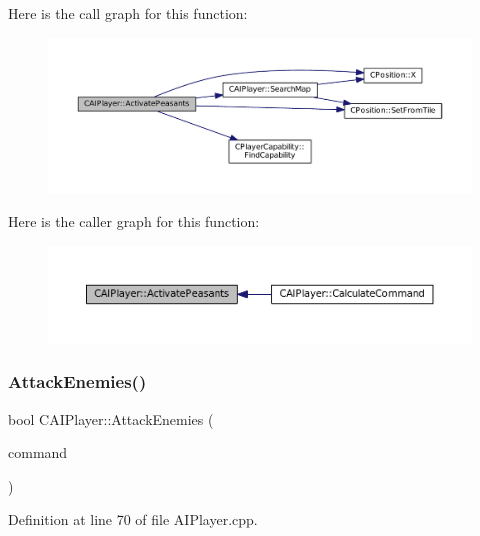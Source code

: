 Here is the call graph for this function\+:\nopagebreak
\begin{figure}[H]
\begin{center}
\leavevmode
\includegraphics[width=350pt]{classCAIPlayer_a3fab1c955fd68bb53fa80bb1872d2819_cgraph}
\end{center}
\end{figure}
Here is the caller graph for this function\+:\nopagebreak
\begin{figure}[H]
\begin{center}
\leavevmode
\includegraphics[width=350pt]{classCAIPlayer_a3fab1c955fd68bb53fa80bb1872d2819_icgraph}
\end{center}
\end{figure}
\hypertarget{classCAIPlayer_adf7feeba7debf9f19b000887616d7bfb}{}\label{classCAIPlayer_adf7feeba7debf9f19b000887616d7bfb} 
\subsubsection{\texorpdfstring{Attack\+Enemies()}{AttackEnemies()}}
{\footnotesize\ttfamily bool C\+A\+I\+Player\+::\+Attack\+Enemies (\begin{DoxyParamCaption}\item[{\hyperlink{structSPlayerCommandRequest}{S\+Player\+Command\+Request} \&}]{command }\end{DoxyParamCaption})\hspace{0.3cm}{\ttfamily [protected]}}



Definition at line 70 of file A\+I\+Player.\+cpp.


